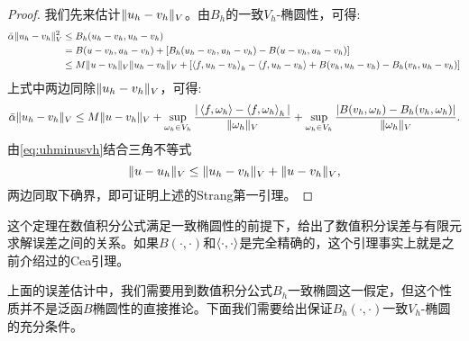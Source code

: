 \begin{proof}
    我们先来估计$\|u_{h}-v_{h}\|_{V}$。由$B_{h}$的一致$V_{h}$-椭圆性，可得:
    \begin{equation}
        \begin{aligned}
            \bar{\alpha}\|u_{h}-v_{h}\|_{V}^{2}&\le B_{h}(u_{h}-v_{h},u_{h}-v_{h})\\
            &=B(u-v_{h},u_{h}-v_{h})+[B_{h}(u_{h}-v_{h},u_{h}-v_{h})-B(u-v_{h},u_{h}-v_{h})]\\
            &\le M\|u-v_{h}\|_{V}\|u_{h}-v_{h}\|_{V}+[\left<f,u_{h}-v_{h}\right>_{h}-\left<f,u_{h}-v_{h}\right>+B(v_{h},u_{h}-v_{h})-B_{h}(v_{h},u_{h}-v_{h})]\\
        \end{aligned}
    \end{equation}
    上式中两边同除$\|u_{h}-v_{h}\|_{V}$，可得:
    \begin{equation}
        \label{eq:uhminusvh}
        \bar{\alpha}\|u_{h}-v_{h}\|_{V}\le M\|u-v_{h}\|_{V}+\sup_{\omega_{h}\in V_{h}}\frac{|\left<f,\omega_{h}\right>-\left<f,\omega_{h}\right>_{h}|}{\|\omega_{h}\|_{V}}+\sup_{\omega_{h}\in V_{h}}\frac{|B(v_{h},\omega_{h})-B_{h}(v_{h},\omega_{h})|}{\|\omega_{h}\|_{V}}.
    \end{equation}
    由\eqref{eq:uhminusvh}结合三角不等式
    \begin{equation}
        \|u-u_{h}\|_{V}\le\|u_{h}-v_{h}\|_{V}+\|u-v_{h}\|_{V},
    \end{equation}
    两边同取下确界，即可证明上述的Strang第一引理。
\end{proof}
\begin{remark}
    这个定理在数值积分公式满足一致椭圆性的前提下，给出了数值积分误差与有限元求解误差之间的关系。如果$B(\cdot,\cdot)$和$\left<\cdot,\cdot\right>$是完全精确的，这个引理事实上就是之前介绍过的Cea引理。
\end{remark}
上面的误差估计中，我们需要用到数值积分公式$B_{h}$一致椭圆这一假定，但这个性质并不是泛函$B$椭圆性的直接推论。下面我们需要给出保证$B_{h}(\cdot,\cdot)$一致$V_{h}$-椭圆的充分条件。

